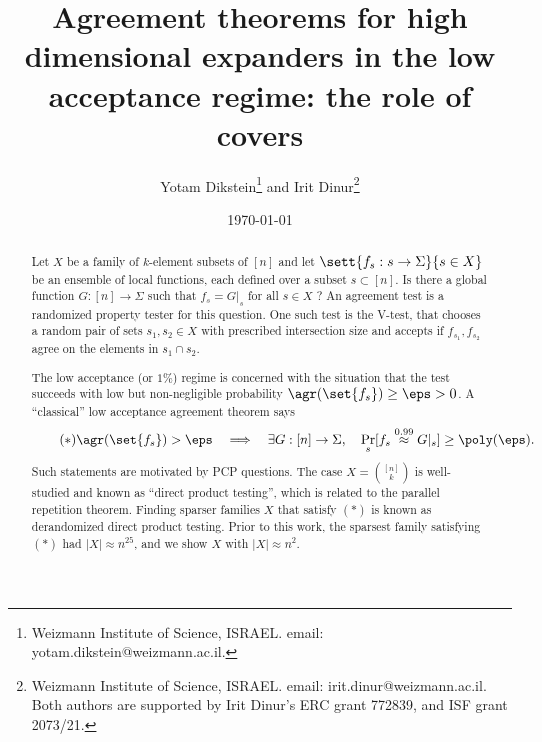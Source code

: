 \documentclass{article}[11pt]
\title{Agreement theorems for high dimensional expanders in the low acceptance regime: the role of covers}
\author{Yotam Dikstein\thanks{Weizmann Institute of Science, ISRAEL. email: yotam.dikstein@weizmann.ac.il.} \;and Irit Dinur\thanks{Weizmann Institute of Science, ISRAEL. email: irit.dinur@weizmann.ac.il. Both authors are supported by Irit Dinur's ERC grant 772839, and ISF grant 2073/21.}}
\date{\today}
\begin{document}
\clearpage\thispagestyle{empty}

\maketitle
\begin{abstract}
Let $X$ be a family of $k$-element subsets of $[n]$ and let $\sett{f_s:s\to\Sigma}{s\in X}$ be an ensemble of local functions, each defined over a subset $s\subset [n]$. Is there a global function $G:[n]\to\Sigma$ such that $f_s = G|_s$ for all $s\in X$ ? An agreement test is a randomized property tester for this question. 
%
One such test is the V-test, that chooses a random pair of sets $s_1,s_2\in X$ with prescribed intersection size and accepts if $f_{s_1},f_{s_2}$ agree on the elements in $s_1\cap s_2$. 

The low acceptance (or $1\%$) regime is concerned with the situation that the test succeeds with low but non-negligible probability $\agr (\set{f_s}) \geq \eps>0$. A ``classical'' low acceptance agreement theorem says  
   \begin{equation*} \tag{$*$}
    \agr (\set{f_s}) > \eps  \quad \Longrightarrow \quad \exists G:[n]\to\Sigma,\quad \Pr_s[f_s\overset{0.99}{\approx} G|_s]\geq\poly(\eps).
\end{equation*}
Such statements are motivated by PCP questions. The case $X=\binom{[n]}k$ is well-studied and known as ``direct product testing'', which is related to the parallel repetition theorem. Finding sparser families $X$ that satisfy $(*)$ is known as derandomized direct product testing. Prior to this work, the sparsest family satisfying $(*)$ had $|X|\approx  n^{25}$, and we show $X$ with $|X|\approx n^2$. 


\end{abstract}
\end{document}
